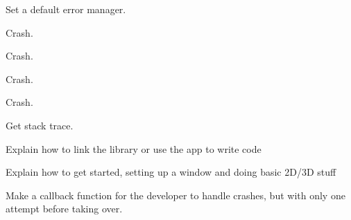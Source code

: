 
\begin{DoxyRefList}
\item[Global \mbox{\hyperlink{_errors_8c_ab17af6118ec5a69109949c0485f2bb9d}{n\+Error\+Throw}} (const int32\+\_\+t error, const char $\ast$info, int32\+\_\+t info\+Len)]\label{todo__todo000001}%
%
Set a default error manager. 

\label{todo__todo000002}%
%
Crash. 

\label{todo__todo000003}%
%
Crash. 

\label{todo__todo000004}%
%
Crash.  
\item[Global \mbox{\hyperlink{_errors_8c_a5c2568530315002dcbfccaafc5821883}{n\+Error\+To\+String}} (char $\ast$dst, int32\+\_\+t $\ast$size, const int32\+\_\+t error, const char $\ast$info, int32\+\_\+t info\+Len)]\label{todo__todo000005}%
%
Crash.  
\item[Global \mbox{\hyperlink{_errors_8c_a51c5b711f13bd8a6090936b7b2c21ecb}{n\+Error\+Get\+Stacktrace}} (char $\ast$dst, int32\+\_\+t $\ast$size, int32\+\_\+t $\ast$levels)]\label{todo__todo000006}%
%
Get stack trace.  
\item[page \mbox{\hyperlink{index}{Nimble Game Engine Library}} ]\label{todo__todo000007}%
%
Explain how to link the library or use the app to write code 

\label{todo__todo000008}%
%
Explain how to get started, setting up a window and doing basic 2D/3D stuff 
\item[Global \mbox{\hyperlink{_crash_handler_8h_ae1d01fa2a0db5fb774bfc0e5a3fd49c7}{n\+Crash\+Safe}} (const int32\+\_\+t error, const char $\ast$error\+Desc, int32\+\_\+t error\+Desc\+Len, const char $\ast$crash\+File\+Path, int32\+\_\+t crash\+File\+Path\+Len) \+\_\+\+\_\+attribute\+\_\+\+\_\+((noreturn))]\label{todo__todo000009}%
%
Make a callback function for the developer to handle crashes, but with only one attempt before taking over. 
\end{DoxyRefList}